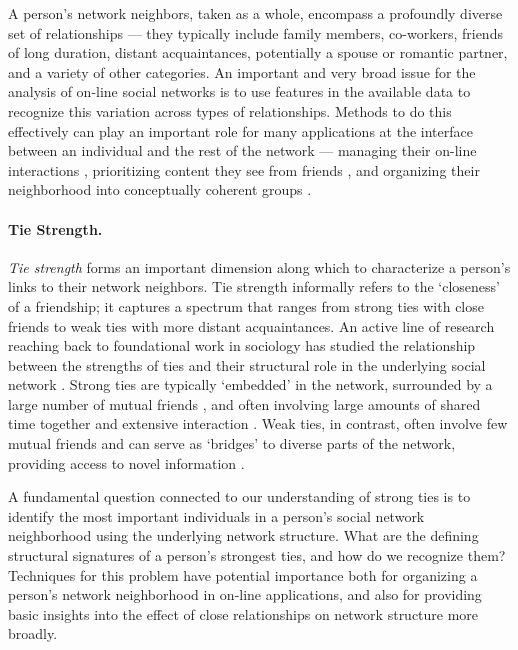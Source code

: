 \documentclass{sigchi}
\newcommand{\xhdr}[1]{\paragraph*{\bf #1.}}
\begin{document}
A person's network neighbors, taken as a whole, 
encompass a profoundly diverse set of relationships ---
they typically include family members, co-workers, friends of long duration,
distant acquaintances, potentially a spouse or romantic partner, and
a variety of other categories.
An important and very broad issue for the analysis of on-line social networks
is to use features in the available data to recognize this variation across 
types of relationships.
Methods to do this effectively can play an important role
for many applications at the interface between an individual
and the rest of the network ---
managing their on-line interactions
\cite{farnham-social-facets},
prioritizing content they see from friends \cite{backstrom-wsdm13},
and organizing their neighborhood into conceptually coherent groups
\cite{mcauley-social-circles,min-social-roles-cscw13}.

\xhdr{Tie Strength}
{\em Tie strength} forms an important dimension along which 
to characterize a person's links to their network neighbors.
Tie strength informally refers to the `closeness' of a friendship;
it captures a spectrum that ranges from
strong ties with close friends to
weak ties with more distant acquaintances.
An active line of research reaching back to foundational work
in sociology has studied the relationship between
the strengths of ties and their structural role in the underlying
social network \cite{granovetter-weak-ties}.
Strong ties are typically `embedded' in the network,
surrounded by a large number of mutual friends
\cite{granovetter-embeddedness,coleman-social-capital},
and often involving large amounts of shared time together
\cite{marsden-tie-strength}
and extensive interaction
\cite{jones-tie-strength}.
Weak ties, in contrast, often involve few mutual friends and
can serve as `bridges' to diverse parts of the network,
providing access to novel information
\cite{granovetter-weak-ties,burt-struct-holes-book}.

A fundamental question connected to our understanding of strong ties
is to identify the most important individuals
in a person's social network neighborhood using the underlying 
network structure.  
What are the defining structural signatures of a person's strongest ties,
and how do we recognize them?
Techniques for this problem have potential importance
both for organizing a person's network neighborhood in on-line applications,
and also for providing basic insights into the effect of close
relationships on network structure more broadly.
\end{document}
